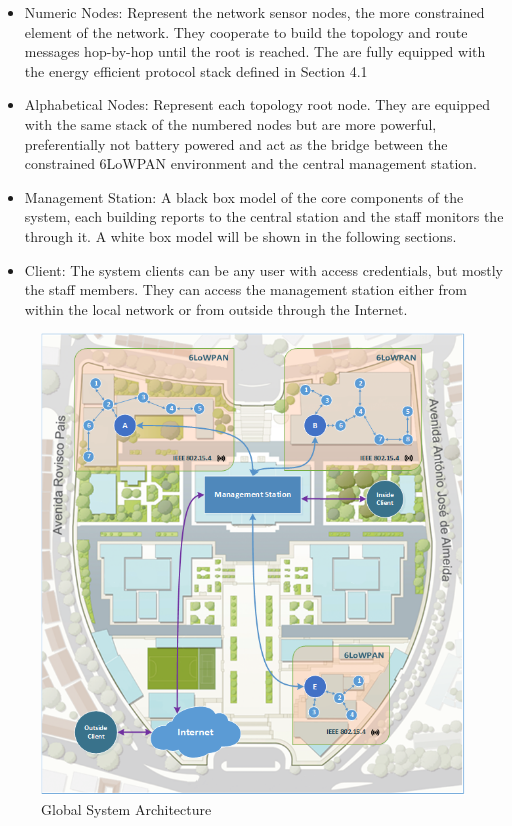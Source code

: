 \begin{itemize}
	\item Numeric Nodes: Represent the network sensor nodes, the more constrained element of the network. They cooperate to build the topology and route messages hop-by-hop until the root is reached. The are fully equipped with the energy efficient protocol stack defined in Section 4.1\\
	\item Alphabetical Nodes: Represent each topology root node. They are equipped with the same stack of the numbered nodes but are more powerful, preferentially not battery powered and act as the bridge between the constrained 6LoWPAN environment and the central management station. \\
	\item Management Station: A black box model of the core components of the system, each building reports to the central station and the staff monitors the through it. A white box model will be shown in the following sections.\\
	\item Client: The system clients can be any user with access credentials, but mostly the staff members. They can access the management station either from within the local network or from outside through the Internet.\\
\end{itemize}
 
\begin{figure}[h]
  \centering
  \includegraphics[width=0.8\linewidth]{figures/Global_Architecture.png}
  \caption{Global System Architecture}
  \label{fig:global_architecture}
\end{figure}


